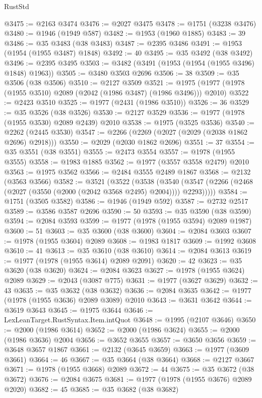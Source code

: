 \begin{lexlean}{RustStd}
\begin{coremodule}
@3475 := @2163 @3474
@3476 := @2027 @3475
@3478 := @1751 (@3238 @3476)
@3480 := @1946 (@1949 @587)
@3482 := @1953 (@1960 @1885)
@3483 := 39
@3486 := @35 @3483 (@38 @3483)
@3487 := @2395 @3486
@3491 := @1953 (@1954 (@1955 @3487) @1848)
@3492 := 40
@3495 := @35 @3492 (@38 @3492)
@3496 := @2395 @3495
@3503 := @3482 (@3491 (@1953 (@1954 (@1955 @3496) @1848) @1963))
@3505 := @3480 @3503 @2696
@3506 := 38
@3509 := @35 @3506 (@38 @3506)
@3510 := @2127 @3509
@3521 := @1975 (@1977 (@1978 (@1955 @3510) @2089 (@2042 (@1986 @3487) (@1986 @3496))) @2010)
@3522 := @2423 @3510
@3525 := @1977 (@2431 (@1986 @3510))
@3526 := 36
@3529 := @35 @3526 (@38 @3526)
@3530 := @2127 @3529
@3536 := @1977 (@1978 (@1955 @3530) @2089 @2439) @2010
@3538 := @1975 (@3525 @3536)
@3540 := @2262 (@2445 @3530)
@3547 := @2266 (@2269 (@2027 (@2029 (@2038 @1862 @2696) @2918)))
@3550 := @2029 (@2030 @1862 @2696)
@3551 := 37
@3554 := @35 @3551 (@38 @3551)
@3555 := @2473 @3554
@3557 := @1978 (@1955 @3555)
@3558 := @1983 @1885
@3562 := @1977 (@3557 @3558 @2479) @2010
@3563 := @1975 @3562
@3566 := @2484 @3555 @2489 @1867
@3568 := @2132 (@3563 @3566)
@3582 := @3521
    (@3522
      (@3538
        (@3540 (@3547 (@2266 (@2468 (@2027 (@3550 (@2000 (@2042 @3568 @2495) @2004)))) @2293)))))
@3584 := @1751 (@3505 @3582)
@3586 := @1946 (@1949 @592)
@3587 := @2732 @2517
@3589 := @3586 @3587 @2696
@3590 := 50
@3593 := @35 @3590 (@38 @3590)
@3594 := @2084 @3593
@3599 := @1977 (@1978 (@1955 @3594) @2089 @1987)
@3600 := 51
@3603 := @35 @3600 (@38 @3600)
@3604 := @2084 @3603
@3607 := @1978 (@1955 @3604) @2089
@3608 := @1983 @1817
@3609 := @1992 @3608
@3610 := 41
@3613 := @35 @3610 (@38 @3610)
@3614 := @2084 @3613
@3619 := @1977 (@1978 (@1955 @3614) @2089 @2091)
@3620 := 42
@3623 := @35 @3620 (@38 @3620)
@3624 := @2084 @3623
@3627 := @1978 (@1955 @3624) @2089
@3629 := @2043 (@3087 @775)
@3631 := @1977 (@3627 @3629)
@3632 := 43
@3635 := @35 @3632 (@38 @3632)
@3636 := @2084 @3635
@3642 := @1977 (@1978 (@1955 @3636) @2089 @3089) @2010
@3643 := @3631 @3642
@3644 := @3619 @3643
@3645 := @1975 @3644
@3646 := LexLeanTarget.RustSyntax.Item.intQuot
@3648 := @1995 (@2107 @3646)
@3650 := @2000 (@1986 @3614)
@3652 := @2000 (@1986 @3624)
@3655 := @2000 (@1986 @3636) @2004
@3656 := @3652 @3655
@3657 := @3650 @3656
@3659 := @3648 @3657 @1867
@3661 := @2132 (@3645 @3659)
@3663 := @1977 (@3609 @3661)
@3664 := 46
@3667 := @35 @3664 (@38 @3664)
@3668 := @2127 @3667
@3671 := @1978 (@1955 @3668) @2089
@3672 := 44
@3675 := @35 @3672 (@38 @3672)
@3676 := @2084 @3675
@3681 := @1977 (@1978 (@1955 @3676) @2089 @2020)
@3682 := 45
@3685 := @35 @3682 (@38 @3682)

\end{coremodule}
\end{lexlean}
